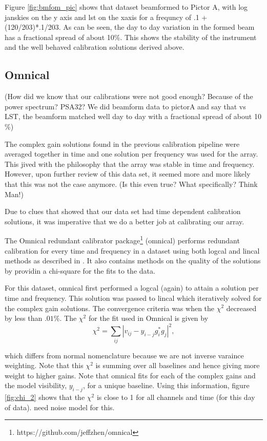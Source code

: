 \documentclass[twocolumn,numberedappendix]{emulateapj}
\begin{document}
{Figure \ref{fig:bmfom_pic} shows that dataset beamformed to Pictor A, with log
janskies on the y axis and lst on the xaxis for a frequncy of .1 + (120/203)*.1/203. 
As can be seen, the day to day variation in the formed beam has a fractional
spread of about 10$\%$.  This shows the stability of the instrument and the well
behaved calibration solutions derived above. 

\subsection{Omnical}
(How did we know that our calibrations were not good enough? Because of the power
spectrum? PSA32? We did beamform data to pictorA and say that vs LST, the
beamform matched well day to day with a fractional spread of about 10$\%$) 

The complex gain solutions found in the previous calibration pipeline were
averaged together in time and one solution per frequency was used for the array.
This jived with the philosophy that the array was stable in time and frequency.
However, upon further review of this data set, it seemed more and more likely
that this was not the case anymore. (Is this even true? What specifically? Think
Man!) 

Due to clues that showed that our data set had time dependent calibration
solutions, it was imperative that we do a better job at calibrating our array.

The Omnical redundant calibrator
package\footnote{https://github.com/jeffzhen/omnical} (omnical) performs
redundant calibration for every time and frequency in a dataset using both
logcal and lincal methods as described in \cite{zheng_et_al2014}. It also
contains methods on the quality of the solutions by providin a chi-square for
the fits to the data. 

For this dataset, omnical first performed a logcal (again) to attain a solution
per time and frequency. This solution was passed to lincal which iteratively
solved for the complex gain solutions. The convergence criteria was when the
$\chi^{2}$ decreased by less than $.01\%$. The $\chi^{2}$ for the fit used in
Omnical is given by 
\begin{equation}
    \chi^{2} = \sum_{ij}|v_{ij} - y_{i-j}g_{i}^{*}g_{j}|^{2},
\end{equation}

which differs from normal nomenclature because we are not inverse varaince
weighting. Note that this $\chi^{2}$ is summing over all baselines and hence 
giving more weight to higher gains. Note that omnical fits for each of the
complex gains and the model visibility, $y_{i-j}$,  for a unique baseline.
Using this information, figure \ref{fig:chi_2} shows that the $\chi^{2}$ is close
to 1 for all channels and time (for this day of data). need noise model for
this.

}
\end{document}
